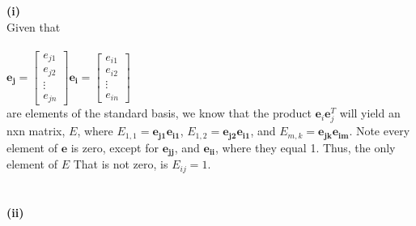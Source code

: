 \documentclass[letterpaper,12pt]{article}
\theoremstyle{definition}
\begin{document}
\textbf{(i)} \\
Given that \\\\
$\mathbf{e_j} = \begin{bmatrix} e_{j1} \\ e_{j2} \\ \vdots \\ e_{jn}\end{bmatrix}
\mathbf{e_i} = \begin{bmatrix} e_{i1} \\ e_{i2} \\ \vdots \\ e_{in}\end{bmatrix}$\\
are elements of the standard basis, we know that the
product $\textbf{e}_i\textbf{e}_j^T$ will yield an nxn matrix, $E$, where $E_{1,1} = \mathbf{e_{j1}}\mathbf{e_{i1}}$, 
$E_{1,2} = \mathbf{e_{j2}}\mathbf{e_{i1}}$, and $E_{m,k} = \mathbf{e_{jk}}\mathbf{e_{im}}$. Note every element of $\mathbf{e}$ is 
zero, except for $\mathbf{e_{jj}}$, and $\mathbf{e_{ii}}$, where they equal 1. Thus, the only element of $E$ That is not zero, is
$E_{ij} = 1$.
\\
\\
\\
\textbf{(ii)} \\
\end{document}
